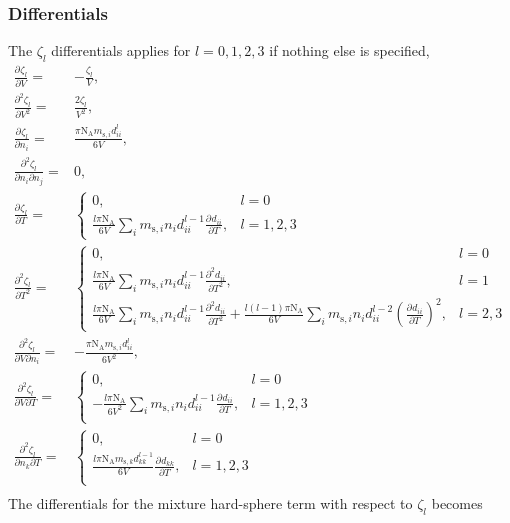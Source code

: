 \documentclass[english]{../thermomemo/thermomemo}
\newcommand*{\pd}[3][]{\frac{\partial^{#1}#2}{\partial{#3}^{#1}}}%
\newcommand*{\pdc}[3]{\frac{\partial^{2}#1}{\partial{#2}\partial{#3}}}%
\newcommand*{\lb}{\left(}
\newcommand*{\rb}{\right)}
\newcommand{\seg}{\ensuremath{\text{s}}\xspace}
\newcommand{\z}{\zeta}
\newcommand{\NA}{\ensuremath{\text{N}_{\text{A}}}\xspace}
\begin{document}
\subsubsection{Differentials}
The $\z_l$ differentials applies for $l = 0,1,2,3$ if nothing else is specified,
\begin{align}
  \label{eq:z_l_n_diff}
  \pd{\z_l}{V} =& -\frac{\z_l}{V},\\
  \pd[2]{\z_l}{V} =& \frac{2\z_l}{V^2},\\
  \pd{\z_l}{n_i} =& \frac{\pi \NA m_{\seg,i} d_{ii}^l}{6 V} ,\\
  \pdc{\z_l}{n_i}{n_j} =& 0,\\
  \pd{\z_l}{T} =& \begin{cases}
    0, & l = 0\\
    \frac{l \pi \NA}{6 V} \sum_i m_{\seg,i} n_i d_{ii}^{l-1} \pd{d_{ii}}{T}, & l = 1,2,3
  \end{cases}\\
  \pd[2]{\z_l}{T} =& \begin{cases}
    0, & l = 0\\
    \frac{l \pi \NA}{6 V} \sum_i m_{\seg,i} n_i d_{ii}^{l-1} \pd[2]{d_{ii}}{T}, & l = 1\\
    \frac{l \pi \NA}{6 V} \sum_i m_{\seg,i} n_i d_{ii}^{l-1} \pd[2]{d_{ii}}{T} + \frac{l\lb l-1\rb \pi \NA}{6 V} \sum_i m_{\seg,i} n_i d_{ii}^{l-2}\lb\pd{d_{ii}}{T}\rb^2, & l = 2,3
  \end{cases}\\
  \pdc{\z_l}{V}{n_i} =& - \frac{\pi \NA m_{\seg,i} d_{ii}^l}{6 V^2},\\
  \pdc{\z_l}{V}{T} =& \begin{cases}
    0, & l = 0\\
    -\frac{l \pi \NA}{6 V^2} \sum_i m_{\seg,i} n_i d_{ii}^{l-1}\pd{d_{ii}}{T}, & l = 1,2,3\\
  \end{cases}\\
  \pdc{\z_l}{n_k}{T} =& \begin{cases}
    0, & l = 0\\
    \frac{l \pi \NA m_{\seg,k} d_{kk}^{l-1}}{6 V}\pd{d_{kk}}{T} , & l = 1,2,3\\
  \end{cases}\\
\end{align}
The differentials for the mixture hard-sphere term with respect to $\z_l$ becomes
\end{document}
